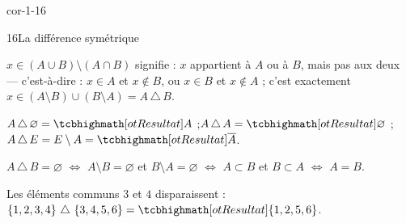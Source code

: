 \begin{blocLivre}{cor-1-16}
\begin{corrige}{16}{La différence symétrique}
\noindent
\begin{minipage}[c]{0.66\linewidth}
\begin{questions}
  \item $x\in(A\cup B)\setminus(A\cap B)$ signifie : $x$ appartient à $A$ ou à $B$, mais pas aux
    deux — c'est-à-dire : $x\in A$ et $x\notin B$, ou $x\in B$ et $x\notin A$ ; c'est exactement
    $x\in(A\setminus B)\cup(B\setminus A)=A\,\triangle\,B$.
  \item $A\,\triangle\,\varnothing=\res{A}$ ;\quad $A\,\triangle\,A=\res{\varnothing}$ ;\quad
    $A\,\triangle\,E=E\setminus A=\res{\overline{A}}$.
  \item $A\,\triangle\,B=\varnothing$ $\iff$ $A\setminus B=\varnothing$ et $B\setminus A=\varnothing$
    $\iff$ $A\subset B$ et $B\subset A$ $\iff$ $A=B$.
  \item Les éléments communs $3$ et $4$ disparaissent :
    $\ens{1,2,3,4}\,\triangle\,\ens{3,4,5,6}=\res{\ens{1,2,5,6}}$.
\end{questions}
\end{minipage}\hfill
\begin{minipage}[c]{0.3\linewidth}
\centering
{}
\end{minipage}
\end{corrige}
\end{blocLivre}

